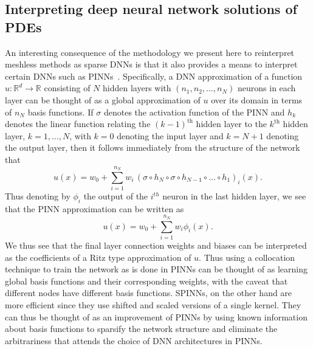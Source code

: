 \documentclass[12pt]{article}
\begin{document}
\subsection{Interpreting deep neural network solutions of PDEs}
An interesting consequence of the methodology we present here to reinterpret meshless methods as sparse DNNs is that it also provides a means to interpret certain DNNs such as PINNs~\cite{RPK2019}. Specifically, a DNN approximation of a function $u:\mathbb{R}^d \to \mathbb{R}$ consisting of $N$ hidden layers with $(n_1, n_2, \ldots, n_N)$ neurons in each layer can be thought of as a global approximation of $u$ over its domain in terms of $n_N$ basis functions. If $\sigma$ denotes the activation function of the PINN and $h_k$ denotes the linear function relating the $(k-1)^{\text{th}}$ hidden layer to the $k^{\text{th}}$ hidden layer, $k = 1, \ldots, N$, with $k = 0$ denoting the input layer and $k = N + 1$ denoting the output layer, then it follows immediately from the structure of the network that
\begin{displaymath}
u(x) = w_0 + \sum_{i=1}^{n_N} w_i \,(\sigma \circ h_{N} \circ \sigma \circ h_{N-1} \circ \ldots \circ h_1)_i(x).
\end{displaymath}
Thus denoting by $\phi_i$ the output of the $i^{th}$ neuron in the last hidden layer, we see that the PINN approximation can be written as
\begin{displaymath}
u(x) = w_0 + \sum_{i=1}^{n_N} w_i \phi_i(x).
\end{displaymath}
We thus see that the final layer connection weights and biases can be interpreted as the coefficients of a Ritz type approximation of $u$. Thus using a collocation technique to train the network as is done in PINNs can be thought of as learning global basis functions and their corresponding weights, with the caveat that different nodes have different basis functions. SPINNs, on the other hand are more efficient since they use shifted and scaled versions of a single kernel. They can thus be thought of as an improvement of PINNs by using known information about basis functions to sparsify the network structure and eliminate the arbitrariness that attends the choice of DNN architectures in PINNs.
\end{document}
